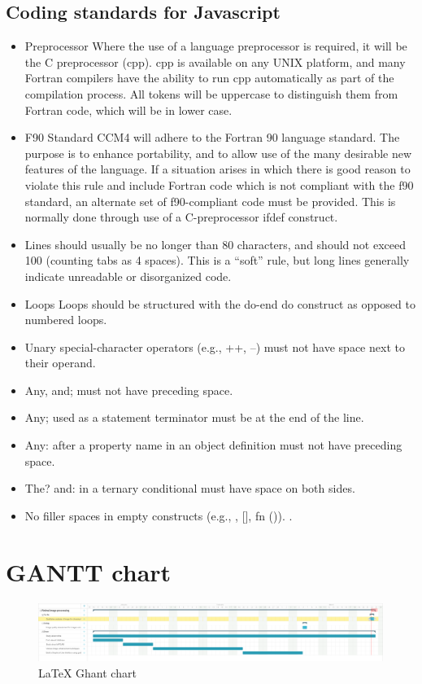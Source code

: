 \subsection{Coding standards for Javascript }
\begin{itemize}

\item Preprocessor Where the use of a language preprocessor is required, it will be the C preprocessor (cpp). cpp is available on any UNIX platform, and many Fortran compilers have the ability to run cpp automatically as part of the compilation process. All tokens will be uppercase to distinguish them from Fortran code, which will be in lower case.

\item F90 Standard CCM4 will adhere to the Fortran 90 language standard. The purpose is to enhance portability, and to allow use of the many desirable new features of the language. If a situation arises in which there is good reason to violate this rule and include Fortran code which is not compliant with the f90 standard, an alternate set of f90-compliant code must be provided. This is normally done through use of a C-preprocessor ifdef construct.
\item Lines should usually be no longer than 80 characters, and should not exceed 100 (counting tabs as 4 spaces). This is a “soft” rule, but long lines generally indicate unreadable or disorganized code.
\item Loops Loops should be structured with the do-end do construct as opposed to numbered loops.
\item Unary special-character operators (e.g., ++, --) must not have space next to their operand.
\item Any, and; must not have preceding space.
\item Any; used as a statement terminator must be at the end of the line.
\item Any: after a property name in an object definition must not have preceding space.
\item The? and: in a ternary conditional must have space on both sides.
\item No filler spaces in empty constructs (e.g., {}, [], fn ()).
.


\end{itemize}

	\section{GANTT chart
	}
	\begin{figure}[ht]
\centering
\includegraphics[scale=0.20]{images/GantChart.png}
\caption{\LaTeX{} Ghant chart}
\end{figure}
	
